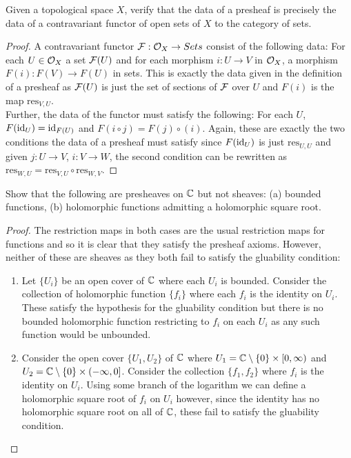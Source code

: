 
\begin{exercise}
    Given a topological space $X$, verify that the data of a presheaf is precisely the data of a contravariant functor of open sets of $X$ to the category of sets. 
\end{exercise}

\begin{proof}
    A contravariant functor $\mathcal{F} : \mathcal{O}_X \to Sets$ consist of the following data: For each $U \in \mathcal{O}_X$ a set $\mathcal{F}(U)$ and for each morphism $i: U \to V$ in $\mathcal{O}_X$, a morphism $F(i): F(V) \to F(U)$ in sets. This is exactly the data given in the definition of a presheaf as $\mathcal{F}(U)$ is just the set of sections of $\mathcal{F}$ over $U$ and $F(i)$ is the map $\text{res}_{V,U}$. \\ 
    Further, the data of the functor must satisfy the following: For each $U$, $F(\text{id}_U) = \text{id}_{F(U)}$ and $F(i \circ j) = F(j) \circ (i)$. Again, these are exactly the two conditions the data of a presheaf must satisfy since $F(\text{id}_U)$ is just $\text{res}_{U, U}$ and given $j: U \to V$, $i: V \to W$, the second condition can be rewritten as $\text{res}_{W, U} =  \text{res}_{V, U} \circ \text{res}_{W, V}$. 
\end{proof}

\begin{exercise}
    Show that the following are presheaves on $\mathbb{C}$ but not sheaves: (a) bounded functions, (b) holomorphic functions admitting a holomorphic square root. 
\end{exercise}

\begin{proof}
    The restriction maps in both cases are the usual restriction maps for functions and so it is clear that they satisfy the presheaf axioms. However, neither of these are sheaves as they both fail to satisfy the gluability condition: 
    \begin{enumerate}[label = (\alph*)]
        \item Let $\{U_i\}$ be an open cover of $\mathbb{C}$ where each $U_i$ is bounded. Consider the collection of holomorphic function $\{f_i\}$ where each $f_i$ is the identity on $U_i$. These satisfy the hypothesis for the gluability condition but there is no bounded holomorphic function restricting to $f_i$ on each $U_i$ as any such function would be unbounded. 
        \item Consider the open cover $\{U_1, U_2\}$ of $\mathbb{C}$ where $U_1 = \mathbb{C} \setminus \{0\} \times [0, \infty)$ and $U_2 = \mathbb{C} \setminus \{0\} \times (-\infty, 0]$. Consider the collection $\{f_1, f_2\}$ where $f_i$ is the identity on $U_i$. Using some branch of the logarithm we can define a holomorphic square root of $f_i$ on $U_i$ however, since the identity has no holomorphic square root on all of $\mathbb{C}$, these fail to satisfy the gluability condition. 
    \end{enumerate}
\end{proof}

